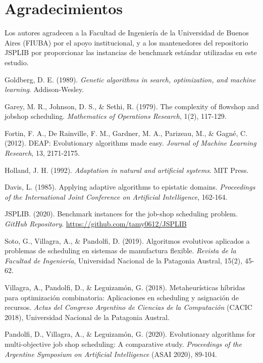 \documentclass[12pt,a4paper]{article}
\begin{document}
\section*{Agradecimientos}

Los autores agradecen a la Facultad de Ingeniería de la Universidad de Buenos Aires (FIUBA) por el apoyo institucional, y a los mantenedores del repositorio JSPLIB por proporcionar las instancias de benchmark estándar utilizadas en este estudio.

\begin{thebibliography}{99}

Goldberg, D. E. (1989). \textit{Genetic algorithms in search, optimization, and machine learning}. Addison-Wesley.

Garey, M. R., Johnson, D. S., \& Sethi, R. (1979). The complexity of flowshop and jobshop scheduling. \textit{Mathematics of Operations Research}, 1(2), 117-129.

Fortin, F. A., De Rainville, F. M., Gardner, M. A., Parizeau, M., \& Gagné, C. (2012). DEAP: Evolutionary algorithms made easy. \textit{Journal of Machine Learning Research}, 13, 2171-2175.

Holland, J. H. (1992). \textit{Adaptation in natural and artificial systems}. MIT Press.

Davis, L. (1985). Applying adaptive algorithms to epistatic domains. \textit{Proceedings of the International Joint Conference on Artificial Intelligence}, 162-164.

JSPLIB. (2020). Benchmark instances for the job-shop scheduling problem. \textit{GitHub Repository}. \url{https://github.com/tamy0612/JSPLIB}

Soto, G., Villagra, A., \& Pandolfi, D. (2019). Algoritmos evolutivos aplicados a problemas de scheduling en sistemas de manufactura flexible. \textit{Revista de la Facultad de Ingeniería}, Universidad Nacional de la Patagonia Austral, 15(2), 45-62.

Villagra, A., Pandolfi, D., \& Leguizamón, G. (2018). Metaheurísticas híbridas para optimización combinatoria: Aplicaciones en scheduling y asignación de recursos. \textit{Actas del Congreso Argentino de Ciencias de la Computación} (CACIC 2018), Universidad Nacional de la Patagonia Austral.

Pandolfi, D., Villagra, A., \& Leguizamón, G. (2020). Evolutionary algorithms for multi-objective job shop scheduling: A comparative study. \textit{Proceedings of the Argentine Symposium on Artificial Intelligence} (ASAI 2020), 89-104.


\end{thebibliography}
\end{document}
